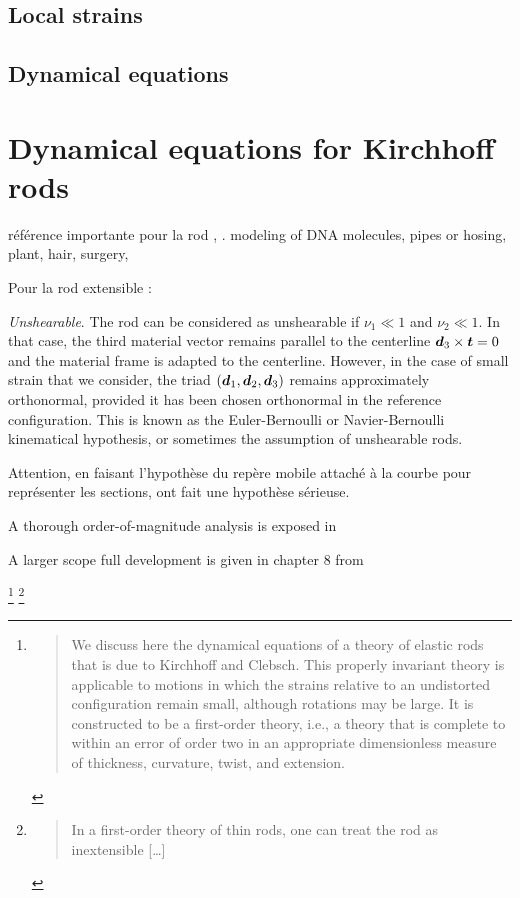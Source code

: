 \subsection{Local strains}

\subsection{Dynamical equations}


\clearpage
\section{Dynamical equations for Kirchhoff rods}

référence importante pour la rod \cite{Moulton2013} , \cite[p.~109]{Villaggio1997}.
modeling of DNA molecules, pipes or hosing, plant, hair, surgery, 

Pour la rod extensible : \cite{Cisternas2002}

\emph{Unshearable}. The rod can be considered as unshearable if $\nu_1 \ll 1$ and $\nu_2 \ll 1$. In that case, the third material vector remains parallel to the centerline  $\boldsymbol{d}_3 \times \boldsymbol{t} = 0$ and the material frame is adapted to the centerline. 
However, in the case of small strain that we consider, the triad $(\boldsymbol{d}_1,\boldsymbol{d}_2,\boldsymbol{d}_3)$ remains approximately orthonormal, provided it has been chosen orthonormal in the reference configuration. This is known as the Euler-Bernoulli or Navier-Bernoulli kinematical hypothesis, or sometimes the assumption of unshearable rods. 



Attention, en faisant l'hypothèse du repère mobile attaché à la courbe pour représenter les sections, ont fait une hypothèse sérieuse.

A thorough order-of-magnitude analysis is exposed in \cite{Dill1992, Coleman1993}

A larger scope full development is given in chapter 8 from \cite[pp.~270-274]{Antman2005}

\footnote{\blockcquote[p.~1]{Coleman1993}{We discuss here the dynamical equations of a theory of elastic rods that is due to Kirchhoff and Clebsch. This properly invariant theory is applicable to motions in which the strains relative to an undistorted configuration remain small, although rotations may be large. It is constructed to be a first-order theory, i.e., a theory that is complete to within an error of order two in an appropriate dimensionless measure of thickness, curvature, twist, and extension.}}
\footnote{\blockcquote[p.~1]{Coleman1993}{In a first-order theory of thin rods, one can treat the rod as inextensible [\dots]}}



